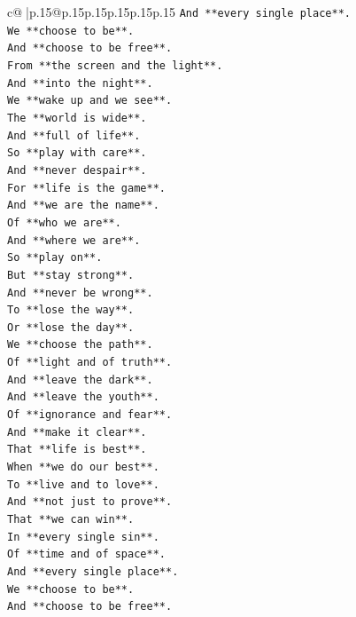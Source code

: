\documentclass{article}
\begin{document}
{\begin{supertabular}{c@{$\;$}|p{.15\linewidth}@{}p{.15\linewidth}p{.15\linewidth}p{.15\linewidth}p{.15\linewidth}p{.15\linewidth}}
{{{\texttt{And **every single place**.} \\
\texttt{We **choose to be**.} \\
\texttt{And **choose to be free**.} \\
\texttt{From **the screen and the light**.} \\
\texttt{And **into the night**.} \\
\texttt{We **wake up and we see**.} \\
\texttt{The **world is wide**.} \\
\texttt{And **full of life**.} \\
\texttt{So **play with care**.} \\
\texttt{And **never despair**.} \\
\texttt{For **life is the game**.} \\
\texttt{And **we are the name**.} \\
\texttt{Of **who we are**.} \\
\texttt{And **where we are**.} \\
\texttt{So **play on**.} \\
\texttt{But **stay strong**.} \\
\texttt{And **never be wrong**.} \\
\texttt{To **lose the way**.} \\
\texttt{Or **lose the day**.} \\
\texttt{We **choose the path**.} \\
\texttt{Of **light and of truth**.} \\
\texttt{And **leave the dark**.} \\
\texttt{And **leave the youth**.} \\
\texttt{Of **ignorance and fear**.} \\
\texttt{And **make it clear**.} \\
\texttt{That **life is best**.} \\
\texttt{When **we do our best**.} \\
\texttt{To **live and to love**.} \\
\texttt{And **not just to prove**.} \\
\texttt{That **we can win**.} \\
\texttt{In **every single sin**.} \\
\texttt{Of **time and of space**.} \\
\texttt{And **every single place**.} \\
\texttt{We **choose to be**.} \\
\texttt{And **choose to be free**.} \\
}}}
\end{supertabular}}
\end{document}
